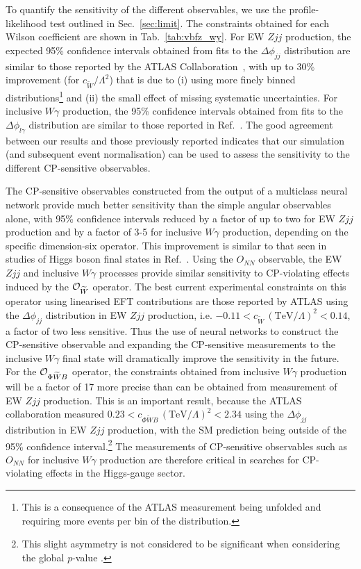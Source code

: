 \documentclass[twocolumn,preprintnumbers,superscriptaddress,nofootinbib,aps,prd,floatfix]{revtex4}
\begin{document}
To quantify the sensitivity of the different observables, we use the profile-likelihood test outlined in Sec.~\ref{sec:limit}. The constraints obtained for each Wilson coefficient are shown in Tab.~\ref{tab:vbfz_wy}. For EW $Zjj$ production, the expected 95\% confidence intervals obtained from fits to the $\Delta\phi_{jj}$ distribution are  similar to those reported by the ATLAS Collaboration~\cite{ATLAS:2020nzk}, with up to 30\% improvement (for $c_{\widetilde{W}} / \Lambda^2$) that is due to (i) using more finely binned distributions\footnote{This is a consequence of the ATLAS measurement being unfolded and requiring more events per bin of the distribution.} and (ii) the small effect of missing systematic uncertainties. For inclusive $W\gamma$ production, the 95\% confidence intervals obtained from fits to the $\Delta\phi_{l\gamma}$ distribution are similar to those reported in Ref.~\cite{Degrande:2021zpv}. The good agreement between our results and those previously reported indicates that our simulation (and subsequent event normalisation) can be used to assess the sensitivity to the different CP-sensitive observables.

The CP-sensitive observables constructed from the output of a multiclass neural network provide much better sensitivity than the simple angular observables alone, with 95\% confidence intervals reduced by a factor of up to two for EW $Zjj$ production and by a factor of 3-5 for inclusive $W\gamma$ production, depending on the specific dimension-six operator. This improvement is similar to that seen in studies of Higgs boson final states in Ref.~\cite{Bhardwaj:2021ujv}. Using the $O_{NN}$ observable, the EW $Zjj$ and inclusive $W\gamma$ processes provide similar sensitivity to CP-violating effects induced by the ${\cal{O}}_{\widetilde{W}}$ operator. The best current experimental constraints on this operator using  linearised EFT contributions are those reported by ATLAS using the $\Delta\phi_{jj}$ distribution in EW $Zjj$ production, i.e. $-0.11<c_{\widetilde{W}}\,(\text{TeV}/\Lambda)^2<0.14$, a factor of two less sensitive. Thus the use of neural networks to construct the CP-sensitive observable and expanding the CP-sensitive measurements to the inclusive $W\gamma$ final state will dramatically improve the sensitivity in the future. For the ${\cal{O}}_{\Phi \widetilde{W}B}$ operator, the constraints obtained from inclusive $W\gamma$ production will be a factor of 17 more precise than can be obtained from measurement of EW $Zjj$ production. This is an important result, because the ATLAS collaboration measured $0.23 < c_{\Phi \widetilde{W}B}\, (\text{TeV}/\Lambda)^2<2.34$ using the $\Delta\phi_{jj}$ distribution in EW $Zjj$ production, with the SM prediction being outside of the 95\% confidence interval.\footnote{This slight asymmetry is not considered to be significant when considering the global $p$-value \cite{ATLAS:2020nzk}. } The measurements of CP-sensitive observables such as $O_{NN}$ for inclusive $W\gamma$ production are therefore critical in searches for CP-violating effects in the Higgs-gauge sector.
\end{document}
